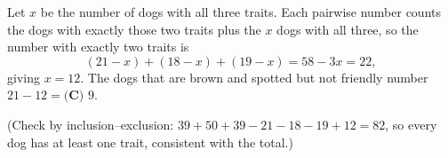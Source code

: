 Let $x$ be the number of dogs with all three traits. Each pairwise number counts the dogs with exactly those two traits plus the $x$ dogs with all three, so the number with exactly two traits is
\[
(21-x)+(18-x)+(19-x)=58-3x=22,
\]
giving $x=12$. The dogs that are brown and spotted but not friendly number $21-12=\boxed{\textbf{(C) }9}$.

(Check by inclusion--exclusion: $39+50+39-21-18-19+12=82$, so every dog has at least one trait, consistent with the total.)
